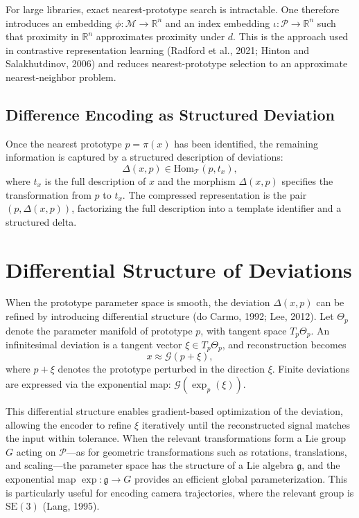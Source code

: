 \documentclass[11pt,a4paper]{article}
\theoremstyle{definition}
\theoremstyle{remark}
\begin{document}
For large libraries, exact nearest-prototype search is intractable. One therefore introduces an embedding $\phi : \mathcal{M} \rightarrow \mathbb{R}^n$ and an index embedding $\iota : \mathcal{P} \rightarrow \mathbb{R}^n$ such that proximity in $\mathbb{R}^n$ approximates proximity under $d$. This is the approach used in contrastive representation learning (Radford et al., 2021; Hinton and Salakhutdinov, 2006) and reduces nearest-prototype selection to an approximate nearest-neighbor problem.

\subsection{Difference Encoding as Structured Deviation}

Once the nearest prototype $p = \pi(x)$ has been identified, the remaining information is captured by a structured description of deviations:
\[
\Delta(x, p) \in \mathrm{Hom}_\mathcal{T}(p, t_x),
\]
where $t_x$ is the full description of $x$ and the morphism $\Delta(x,p)$ specifies the transformation from $p$ to $t_x$. The compressed representation is the pair $(p, \Delta(x,p))$, factorizing the full description into a template identifier and a structured delta.

\section{Differential Structure of Deviations}
\label{sec:differential}

When the prototype parameter space is smooth, the deviation $\Delta(x,p)$ can be refined by introducing differential structure (do Carmo, 1992; Lee, 2012). Let $\Theta_p$ denote the parameter manifold of prototype $p$, with tangent space $T_p\Theta_p$. An infinitesimal deviation is a tangent vector $\xi \in T_p\Theta_p$, and reconstruction becomes
\[
x \approx \mathcal{G}(p + \xi),
\]
where $p + \xi$ denotes the prototype perturbed in the direction $\xi$. Finite deviations are expressed via the exponential map: $\mathcal{G}(\exp_p(\xi))$.

This differential structure enables gradient-based optimization of the deviation, allowing the encoder to refine $\xi$ iteratively until the reconstructed signal matches the input within tolerance. When the relevant transformations form a Lie group $G$ acting on $\mathcal{P}$---as for geometric transformations such as rotations, translations, and scaling---the parameter space has the structure of a Lie algebra $\mathfrak{g}$, and the exponential map $\exp : \mathfrak{g} \rightarrow G$ provides an efficient global parameterization. This is particularly useful for encoding camera trajectories, where the relevant group is $\mathrm{SE}(3)$ (Lang, 1995).
\end{document}
